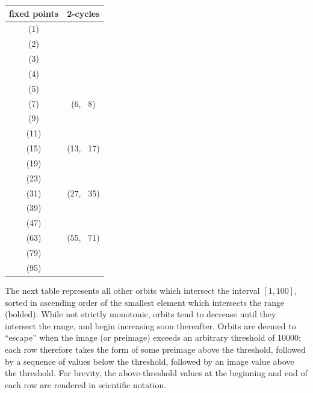 \documentclass[12pt,reqno]{article}
\begin{document}
\begin{center} \begin{tabular}{|c|c|}
  \hline
  fixed points & 2-cycles \\
  \hline
  (1) & \\
  (2) & \\
  (3) & \\
  (4) & \\
  (5) & \\
  (7) & (6, \, 8) \\
  (9) & \\
  (11) & \\
  (15) & (13, \, 17) \\
  (19) & \\
  (23) & \\
  (31) & (27, \, 35) \\
  (39) & \\
  (47) & \\
  (63) & (55, \, 71) \\
  (79) & \\
  (95) & \\
  \hline
\end{tabular} \end{center}

The next table represents all other orbits which intersect the interval $ [1, 100] $, sorted in ascending order of the smallest element which intersects the range (bolded). While not strictly monotonic, orbits tend to decrease until they intersect the range, and begin increasing soon thereafter. Orbits are deemed to ``escape'' when the image (or preimage) exceeds an arbitrary threshold of 10000; each row therefore takes the form of some preimage above the threshold, followed by a sequence of values below the threshold, followed by an image value above the threshold. For brevity, the above-threshold values at the beginning and end of each row are rendered in scientific notation.
\end{document}
